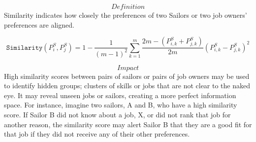 \[\textit{Definition}\]
Similarity indicates how closely the preferences of two Sailors or two job owners’ preferences are aligned. 

\[\texttt{Similarity}(P^S_i, P^S_j) = 1 - \frac{1}{(m-1)^2}\sum_{k=1}^{m} \frac{2m - (P^S_{i,k} + P^S_{j,k})}{2m}(P^S_{i,k} - P^S_{j,k})^2\]

\[\textit{Impact}\] 
High similarity scores between pairs of sailors or pairs of job owners may be used to identify hidden groups; clusters of skills or jobs that are not clear to the naked eye. It may reveal unseen jobs or sailors, creating a more perfect information space. For instance, imagine two sailors, A and B, who have a high similarity score. If Sailor B did not know about a job, X, or did not rank that job for another reason, the similarity score may alert Sailor B that they are a good fit for that job if they did not receive any of their other preferences.
